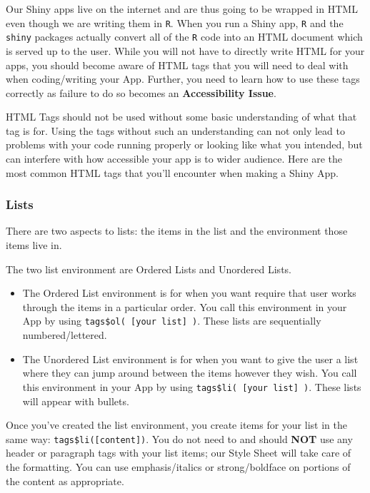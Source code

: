 \documentclass[]{book}
\providecommand{\tightlist}{%
  \setlength{\itemsep}{0pt}\setlength{\parskip}{0pt}}
\begin{document}
Our Shiny apps live on the internet and are thus going to be wrapped in HTML even though we are writing them in \texttt{R}. When you run a Shiny app, \texttt{R} and the \texttt{shiny} packages actually convert all of the \texttt{R} code into an HTML document which is served up to the user. While you will not have to directly write HTML for your apps, you should become aware of HTML tags that you will need to deal with when coding/writing your App. Further, you need to learn how to use these tags correctly as failure to do so becomes an \textbf{Accessibility Issue}.

HTML Tags should not be used without some basic understanding of what that tag is for. Using the tags without such an understanding can not only lead to problems with your code running properly or looking like what you intended, but can interfere with how accessible your app is to wider audience. Here are the most common HTML tags that you'll encounter when making a Shiny App.

\hypertarget{lists}{%
\subsubsection{Lists}\label{lists}}

There are two aspects to lists: the items in the list and the environment those items live in.

The two list environment are Ordered Lists and Unordered Lists.

\begin{itemize}
\tightlist
\item
  The Ordered List environment is for when you want require that user works through the items in a particular order. You call this environment in your App by using \texttt{tags\$ol(\ {[}your\ list{]}\ )}. These lists are sequentially numbered/lettered.
\item
  The Unordered List environment is for when you want to give the user a list where they can jump around between the items however they wish. You call this environment in your App by using \texttt{tags\$li(\ {[}your\ list{]}\ )}. These lists will appear with bullets.
\end{itemize}

Once you've created the list environment, you create items for your list in the same way: \texttt{tags\$li({[}content{]})}. You do not need to and should \textbf{NOT} use any header or paragraph tags with your list items; our Style Sheet will take care of the formatting. You can use emphasis/italics or strong/boldface on portions of the content as appropriate.
\end{document}
